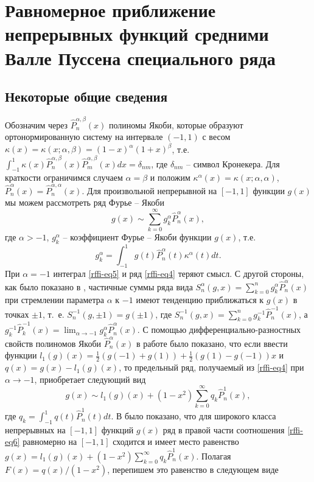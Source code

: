 
\chapter{Равномерное приближение непрерывных функций средними Валле Пуссена специального ряда}
\section{Некоторые общие сведения}
Обозначим через $\hat P_n^{\alpha,\beta}(x)$ полиномы Якоби, которые образуют ортонормированную систему на интервале $(-1,1)$ с весом $\kappa(x)=\kappa(x;\alpha,\beta)=(1-x)^\alpha(1+x)^\beta$, т.е. $\int_{-1}^1\kappa(x)\hat P_n^{\alpha,\beta}(x)\hat P_m^{\alpha,\beta}(x)dx=\delta_{nm}$, где $\delta_{nm}$ -- символ Кронекера. Для краткости ограничимся случаем $\alpha=\beta$ и положим $\kappa^\alpha(x)=\kappa(x;\alpha,\alpha)$,
$\hat P_n^{\alpha}(x)=\hat P_n^{\alpha,\alpha}(x)$. Для произвольной непрерывной на $[-1,1]$ функции $g(x)$ мы можем рассмотреть ряд Фурье -- Якоби
\begin{equation}\label{rffi-eq4}
g(x)\sim\sum_{k=0}^\infty g_k^\alpha\hat P_n^{\alpha}(x),
\end{equation}
где $\alpha>-1$, $g_k^\alpha$ -- коэффициент Фурье -- Якоби функции $g(x)$, т.е.
\begin{equation}\label{rffi-eq5}
g_k^\alpha=\int_{-1}^1 g(t)\hat P_n^{\alpha}(t)\kappa^\alpha(t)dt.
\end{equation}
При $\alpha=-1$ интеграл \eqref{rffi-eq5} и ряд \eqref{rffi-eq4} теряют смысл. С другой стороны, как было показано в \cite{rffi-13}, частичные суммы  ряда вида $S_n^\alpha(g,x)=\sum_{k=0}^n g_k^\alpha\hat P_n^{\alpha}(x)$ при стремлении параметра $\alpha$ к $-1$ имеют тенденцию приближаться к $g(x)$ в точках $\pm1$, т.~е. $S_n^{-1}(g,\pm1)=g(\pm1)$, где $S_n^{-1}(g,x)=\sum_{k=0}^n g_k^{-1}\hat P_n^{-1}(x)$, а $ g_k^{-1}\hat P_k^{-1}(x)=\lim_{\alpha\to-1}g_k^\alpha\hat P_n^{\alpha}(x)$. С помощью дифференциально-разностных свойств полиномов Якоби $\hat P_n^{\alpha}(x)$ в работе \cite{rffi-13} было показано, что если ввести функции $l_1(g)(x)=\frac12(g(-1)+g(1))+\frac12(g(1)-g(-1))x$ и $q(x)=g(x)-l_1(g)(x)$, то предельный ряд, получаемый из \eqref{rffi-eq4} при $\alpha\to-1$, приобретает  следующий вид
\begin{equation}\label{rffi-eq6}
g(x)\sim l_1(g)(x)+(1-x^2)\sum_{k=0}^\infty q_k\hat P_n^1(x),
\end{equation}
где $q_k=\int_{-1}^1q(t)\hat P_n^1(t)dt$. В \cite{rffi-13} было показано, что для широкого класса непрерывных на $[-1,1]$ функций $g(x)$ ряд в правой части соотношения \eqref{rffi-eq6} равномерно на $[-1,1]$ сходится и имеет место равенство $g(x)= l_1(g)(x)+(1-x^2)\sum_{k=0}^\infty q_k\hat P_n^1(x)$. Полагая $F(x)=q(x)/(1-x^2)$, перепишем это равенство в следующем виде
